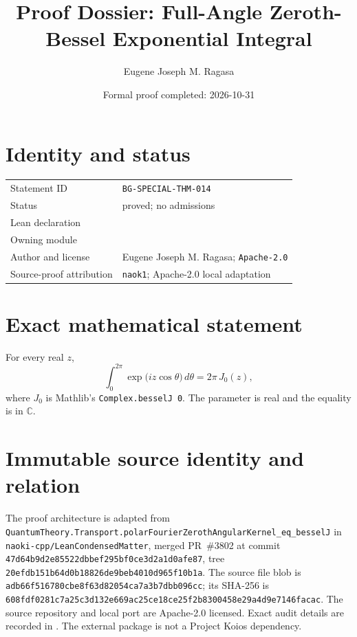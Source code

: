 \documentclass[10pt]{article}
\title{Proof Dossier: Full-Angle Zeroth-Bessel Exponential Integral}
\author{Eugene Joseph M. Ragasa}
\date{Formal proof completed: 2026-10-31}
\begin{document}
\raggedright
\maketitle

\section{Identity and status}
\begin{tabularx}{\textwidth}{@{}lY@{}}
\toprule
Statement ID & \texttt{BG-SPECIAL-THM-014} \\
Status & proved; no admissions \\
Lean declaration &  \\
Owning module &  \\
Author and license & Eugene Joseph M. Ragasa; \texttt{Apache-2.0} \\
Source-proof attribution & \texttt{naok1}; Apache-2.0 local adaptation \\
\bottomrule
\end{tabularx}

\section{Exact mathematical statement}
For every real $z$,
\[
  \int_0^{2\pi} \exp\!\bigl(i z\cos\theta\bigr)\,d\theta
   = 2\pi\,J_0(z),
\]
where $J_0$ is Mathlib's \texttt{Complex.besselJ 0}. The parameter is real and the equality is in
$\mathbb C$.

\section{Immutable source identity and relation}
The proof architecture is adapted from
\texttt{QuantumTheory.Transport.polarFourierZerothAngularKernel\_eq\_besselJ} in
\texttt{naoki-cpp/LeanCondensedMatter}, merged PR~\#3802 at commit
\texttt{47d64b9d2e85522dbbef295bf0ce3d2a1d0afe87}, tree
\texttt{20efdb151b64d0b18826de9beb4010d965f10b1a}. The source file blob is
\texttt{adb66f516780cbe8f63d82054ca7a3b7dbb096cc}; its SHA-256 is
\texttt{608fdf0281c7a25c3d132e669ac25ce18ce25f2b8300458e29a4d9e7146facac}.
The source repository and local port are Apache-2.0 licensed. Exact audit details are recorded in
. The external package is not a Project Koios dependency.
\end{document}
